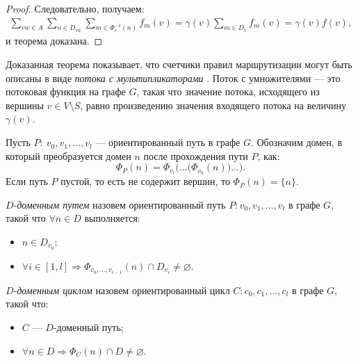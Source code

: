 \documentclass[../thesis.tex]{subfiles}
\begin{document}
\begin{proof}
Следовательно, получаем:
\begin{equation} \label{eq:cons_2_3}
\begin{split}
    \sum_{vw\in A} {
        \sum_{n\in D_{vw}} {
            \sum_{m\in \Phi^{-1}_v(n)} {f_m(v)}
        }
    }
    = \gamma(v)\sum_{m\in D_v} {f_m(v)}
    = \gamma(v)f(v),
\end{split}
\end{equation}
и теорема доказана.
\end{proof}

Доказанная теорема показывает, что счетчики правил маршрутизации могут быть описаны в виде \textit{потока с мультипликаторами} \cite{garey2002computers}.
Поток с умножителями --- это потоковая функция на графе $G$, такая что значение потока, исходящего из вершины $v\in V\setminus S$, равно произведению значения входящего потока на величину $\gamma(v)$.

Пусть $P:\ v_0,v_1,\dots,v_l$ --- ориентированный путь в графе $G$.
Обозначим домен, в который преобразуется домен $n$ после прохождения пути $P$, как:
\begin{equation} \label{eq:n_P}
    \Phi_{P}(n)
    =
    \Phi_{v_l}\Big(\dots\big(\Phi_{v_0}(n)\big)\dots\Big).
\end{equation}
Если путь $P$ пустой, то есть не содержит вершин, то $\Phi_{P}(n) = \{n\}$.

\begin{definition}
$D$-\textit{доменным путем} назовем ориентированный путь $P:v_0,v_1,\dots,v_l$ в графе $G$, такой что $\forall n\in D$ выполняется:
\begin{itemize}
\item $n\in D_{v_0}$;
\item $\forall i\in [1,l] \Rightarrow \Phi_{v_0,\dots,v_{i-1}}(n)\cap D_{v_i}\neq \varnothing$.
\end{itemize}
\end{definition}

\begin{definition}
$D$-\textit{доменным циклом} назовем ориентированный цикл $C:c_0,c_1,\dots,c_l$ в графе $G$, такой что:
\begin{itemize}
\item $C$ --- $D$-доменный путь;
\item $\forall n\in D \Rightarrow \Phi_C(n)\cap D\neq \varnothing$.
\end{itemize}
\end{definition}
\end{document}
